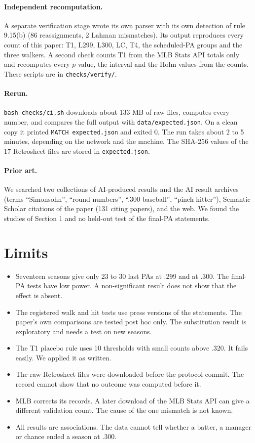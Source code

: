 \documentclass[11pt]{article}
\begin{document}
\paragraph{Independent recomputation.} A separate verification stage wrote its own parser with its own detection of rule 9.15(b) (86 reassignments, 2 Lahman mismatches). Its output reproduces every count of this paper: T1, L299, L300, LC, T4, the scheduled-PA groups and the three walkers. A second check counts T1 from the MLB Stats API totals only and recomputes every $p$-value, the interval and the Holm values from the counts. These scripts are in \texttt{checks/verify/}.

\paragraph{Rerun.} \texttt{bash checks/ci.sh} downloads about 133 MB of raw files, computes every number, and compares the full output with \texttt{data/expected.json}. On a clean copy it printed \texttt{MATCH expected.json} and exited 0. The run takes about 2 to 5 minutes, depending on the network and the machine. The SHA-256 values of the 17 Retrosheet files are stored in \texttt{expected.json}.

\paragraph{Prior art.} We searched two collections of AI-produced results and the AI result archives (terms ``Simonsohn'', ``round numbers'', ``.300 baseball'', ``pinch hitter''), Semantic Scholar citations of the paper (131 citing papers), and the web. We found the studies of Section 1 and no held-out test of the final-PA statements.

\section{Limits}

\begin{itemize}
\item Seventeen seasons give only 23 to 30 last PAs at .299 and at .300. The final-PA tests have low power. A non-significant result does not show that the effect is absent.
\item The registered walk and hit tests use press versions of the statements. The paper's own comparisons are tested post hoc only. The substitution result is exploratory and needs a test on new seasons.
\item The T1 placebo rule uses 10 thresholds with small counts above .320. It fails easily. We applied it as written.
\item The raw Retrosheet files were downloaded before the protocol commit. The record cannot show that no outcome was computed before it.
\item MLB corrects its records. A later download of the MLB Stats API can give a different validation count. The cause of the one mismatch is not known.
\item All results are associations. The data cannot tell whether a batter, a manager or chance ended a season at .300.
\end{itemize}
\end{document}

